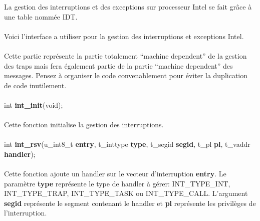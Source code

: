 \documentclass[10pt,a4wide]{article}
\begin{document}
La gestion des interruptions et des exceptions sur processeur Intel se fait
gr\^ace \`a une table nomm\'ee IDT.

\paragraph{}

Voici l'interface a utiliser pour la gestion des interruptions et exceptions
Intel.

\paragraph{}

Cette partie repr\'esente la partie totalement ``machine dependent'' de la
gestion des traps mais fera \'egalement partie de la partie
``machine dependent'' des messages. Pensez \`a organiser le code convenablement
pour \'eviter la duplication de code inutilement.

\paragraph{}

\hspace{1.5cm}int \textbf{int\_init}(void);

\paragraph{}

Cette fonction initialise la gestion des interruptions.

\paragraph{}

\hspace{1.5cm}int \textbf{int\_rsv}(u\_int8\_t \textbf{entry},
                                    t\_inttype \textbf{type},
                                    t\_segid \textbf{segid},
                                    t\_pl \textbf{pl},
                                    t\_vaddr \textbf{handler});

\paragraph{}

Cette fonction ajoute un handler sur le vecteur d'interruption \textbf{entry}.
Le param\`etre \textbf{type} repr\'esente le type de handler \`a g\'erer:
INT\_TYPE\_INT, INT\_TYPE\_TRAP, INT\_TYPE\_TASK ou INT\_TYPE\_CALL. L'argument
\textbf{segid} repr\'esente le segment contenant le handler et \textbf{pl}
repr\'esente les privil\`eges de l'interruption.
\end{document}
